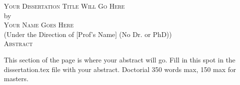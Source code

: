 \documentclass[12pt, notitlepage, twoside]{report} %
\begin{document}

\newcommand{\doctitle}{Your Dissertation Title Will Go Here}
\newcommand{\docauthor}{Your Name Goes Here}






\newpage

\thispagestyle{empty}
\vspace*{18pt}
\begin{center}
  \textsc{\Large{\doctitle}}\\[18pt]  %
  by\\[18pt]
  \textsc{\Large\docauthor}\\[12pt]
  (Under the Direction of [Prof's Name] (No Dr. or PhD))\\[12pt]
  \textsc{Abstract}
\end{center}

This section of the page is where your abstract will go. Fill in this spot in the dissertation.tex file with your abstract. Doctorial 350 words max, 150 max for masters.

\thispagestyle{empty}

\begin{list}{\textsc{Index words:\hfill}}{\leftmargin 1.4in}
  \item \begin{flushleft}
  \end{flushleft}
\end{list}
\end{document}
